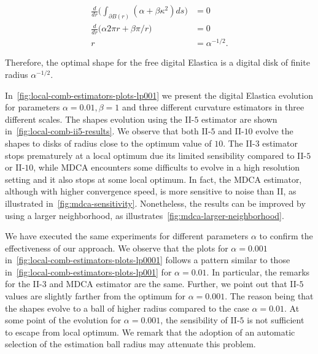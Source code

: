 \begin{align*}
	\frac{d}{dr}\big( \int_{\partial B(r)}{ (\alpha + \beta \kappa ^2) ds} \big ) &= 0\\
	\frac{d}{dr}\big( \alpha 2\pi r + \beta \pi/r \big) &= 0\\
	r &= \alpha^{-1/2}.
\end{align*}  

Therefore, the optimal shape for the free digital Elastica is a digital disk of finite radius $\alpha^{-1/2}$.


In~\cref{fig:local-comb-estimators-plots-lp001} we present the digital Elastica evolution for parameters $\alpha=0.01, \beta=1$ and three different curvature estimators in three different scales. The shapes evolution using the II-$5$ estimator are shown in~\cref{fig:local-comb-ii5-results}. We observe that both II-$5$ and II-$10$ evolve the shapes to disks of radius close to the optimum value of $10$. The II-$3$ estimator stops prematurely at a local optimum due its limited sensibility compared to II-$5$ or II-$10$, while MDCA encounters some difficults to evolve in a high resolution setting and it also stops at some local optimum. In fact, the MDCA estimator, although with higher convergence speed, is more sensitive to noise than II, as illustrated in~\cref{fig:mdca-sensitivity}. Nonetheless, the results can be improved by using a larger neighborhood, as illustrates~\cref{fig:mdca-larger-neighborhood}.



We have executed the same experiments for different parameters $\alpha$ to confirm the effectiveness of our approach. We observe that the plots for $\alpha=0.001$ in~\cref{fig:local-comb-estimators-plots-lp0001} follows a pattern similar to those in~\cref{fig:local-comb-estimators-plots-lp001} for $\alpha=0.01$. In particular, the remarks for the II-$3$ and MDCA estimator are the same. Further, we point out that II-$5$ values are slightly farther from the optimum for $\alpha=0.001$. The reason being that the shapes evolve to a ball of higher radius compared to the case $\alpha=0.01$. At some point of the evolution for $\alpha=0.001$, the sensibility of II-$5$ is not sufficient to escape from local optimum. We remark that the adoption of an automatic selection of the estimation ball radius may attenuate this problem.



